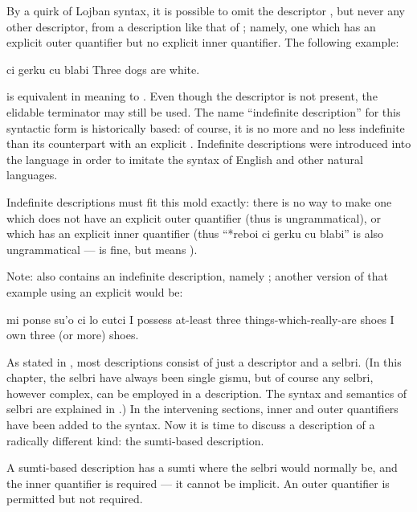 By a quirk of Lojban syntax, it is possible to omit the
    descriptor , but never any other descriptor, from a
    description like that of ;
    namely, one which has an explicit outer quantifier but no
    explicit inner quantifier. The following example:
\begin{example}
ci gerku  cu blabi\n
Three dogs are white.
\end{example}

{\noindent}is equivalent in meaning to .
    Even though the descriptor is not present, the elidable
    terminator  may still be used. The name ``indefinite
    description'' for this syntactic form is historically based: of
    course, it is no more and no less indefinite than its
    counterpart with an explicit . Indefinite descriptions
    were introduced into the language in order to imitate the
    syntax of English and other natural languages. 

Indefinite descriptions must fit this mold exactly: there is
    no way to make one which does not have an explicit outer
    quantifier (thus  is ungrammatical), or
    which has an explicit inner quantifier (thus ``*reboi ci gerku
    cu blabi'' is also ungrammatical --- 
    is fine, but means ).

Note:  also contains an
    indefinite description, namely ; another
    version of that example using an explicit  would be:
\begin{example}
mi ponse su'o ci lo cutci\n
I possess at-least three things-which-really-are shoes\n
I own three (or more) shoes.
\end{example}



As stated in , most descriptions
    consist of just a descriptor and a selbri. (In this chapter,
    the selbri have always been single gismu, but of course any
    selbri, however complex, can be employed in a description. The
    syntax and semantics of selbri are explained in .) In the intervening sections,
    inner and outer quantifiers have been added to the syntax. Now
    it is time to discuss a description of a radically different
    kind: the sumti-based description.

A sumti-based description has a sumti where the selbri would
    normally be, and the inner quantifier is required --- it cannot
    be implicit. An outer quantifier is permitted but not
    required.

